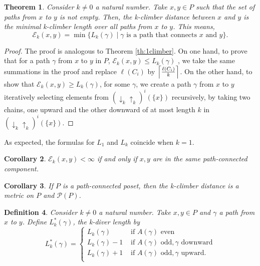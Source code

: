 \documentclass{article}[12pt]
\theoremstyle{exampstyle}
\newtheorem{theorem}{Theorem}[section]
\newtheorem{corollary}[theorem]{Corollary}
\newtheorem{definition}[theorem]{Definition}
\theoremstyle{remark}
\newcommand{\E}{\mathcal{E}}
\renewcommand{\P}{\mathcal{P}}
\newcommand{\updown}[1][]{\downarrow_{#1} \uparrow_{#1}}
\DeclarePairedDelimiter{\ceil}{\lceil}{\rceil}
\newcommand{\myceil}[2][k]{\ceil[\Big]{\frac{#2 }{#1}}}
\begin{document}
\begin{theorem}
   Consider $k \neq 0$ a natural number. Take $x,y \in P $ such that the set of paths from $x$ to $y$ is not empty. Then, the k-climber distance between $x$ and $y$ is the minimal k-climber length over all paths from $x$ to $y$. This means,\[\E_k(x,y) = \min \{ L_k(\gamma) \mid \gamma \text { is a path that connects } x \text{ and } y\}. \]
    \label{th:kclimber}
\end{theorem}
\begin{proof}
    The proof is analogous to Theorem \ref{th:1climber}. On one hand, to prove that for a path $\gamma$ from $x$ to $y$ in $P$, $\E_k(x,y) \leq L_k(\gamma) $ , we take the same summations in the proof and replace $\ell(C_i)$ by  $\myceil{\ell(C_i)}$. On the other hand, to show that $\E_k(x,y) \geq L_k(\gamma)$, for some $\gamma$, we create a path $\gamma$ from $x$ to $y$ iteratively selecting elements from $(\updown[k])^i(\{x\})$ recursively,
    by taking two chains, one upward and the other downward of at most length $k$ in $(\updown[k])^i(\{x\})$.
\end{proof}

As expected, the formulas for $L_1$ and $L_k$ coincide when $k=1$.

\begin{corollary}
    $\E_k(x,y) < \infty$ if and only if $x,y$ are in the same path-connected component. 
    \label{coro_finite_if_connected_1}
\end{corollary}

\begin{corollary}
    If $P$ is a path-connected poset, then the k-climber distance is a metric on $P$ and $\P(P)$.
\end{corollary}

\begin{definition}
    Consider $k \neq 0$ a natural number. Take $x,y \in P $ and $\gamma$ a path from $x$ to $y$. Define $L^*_k(\gamma)$, the \textit{k-diver length} by
    \begin{equation*}
        L^*_k(\gamma) = \left\{ 
        \begin{array}{cc}
            L_k(\gamma) &  \text{ if } A(\gamma) \text{ even}\\
            L_k(\gamma) - 1 &  \text{ if } A(\gamma) \text{ odd}, \gamma \text{ downward}\\
            L_k(\gamma) +1  &  \text{ if } A(\gamma) \text{ odd}, \gamma \text{ upward}.\\
        \end{array}
        \right.
    \end{equation*}
    
\end{definition}
\end{document}
